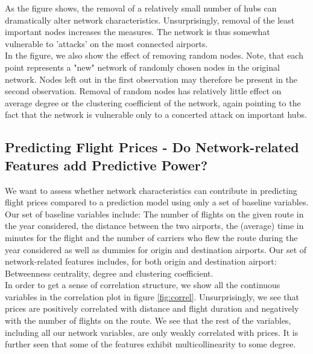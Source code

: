 As the figure shows, the removal of a relatively small number of hubs can dramatically alter network characteristics. Unsurprisingly, removal of the least important nodes increases the measures. The network is thus somewhat vulnerable to 'attacks' on the most connected airports. \\ In the figure, we also show the effect of removing random nodes. Note, that each point represents a "new" network of randomly chosen nodes in the original network. Nodes left out in the first observation may therefore be present in the second observation.  Removal of random nodes has relatively little effect on average degree or the clustering coefficient of the network, again pointing to the fact that the network is vulnerable only to a concerted attack on important hubs. \\ 

\subsection{Predicting Flight Prices - Do Network-related Features add Predictive Power?}
We want to assess whether network characteristics can contribute in predicting flight prices compared to a prediction model using only a set of baseline variables. Our set of baseline variables include: The number of flights on the given route in the year considered, the distance between the two airports, the (average) time in minutes for the flight and the number of carriers who flew the route during the year considered as well as dummies for origin and destination airports. Our set of network-related features includes, for both origin and destination airport: Betweenness centrality, degree and clustering coefficient. \\

In order to get a sense of correlation structure, we show all the continuous variables in the correlation plot in figure \ref{fig:correl}. Unsurprisingly, we see that prices are positively correlated with distance and flight duration and negatively with the number of flights on the route. We see that the rest of the variables, including all our network variables, are only weakly correlated with prices. It is further seen that some of the features exhibit multicollinearity to some degree.


